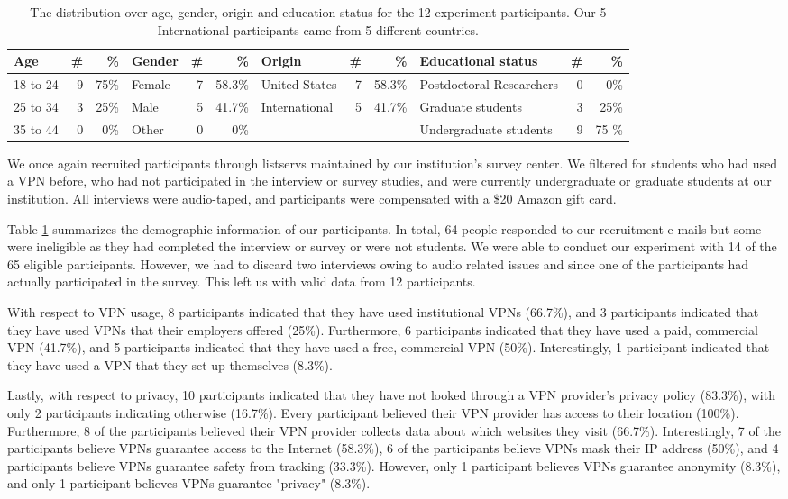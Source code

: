 \begin{table}[h!]
\centering
\begin{tabular}{l r r |l r r|l r r|l r r} 
 \hline
 Age & \# & \% & Gender & \# & \% & Origin & \# & \% & Educational status & \# & \% \\
\hline
18 to 24 & 9 & 75\% & Female & 7 & 58.3\% & United States & 7 & 58.3\% & Postdoctoral Researchers & 0 & 0\% \\
25 to 34 & 3 & 25\% & Male & 5 & 41.7\% & International & 5 & 41.7\% & Graduate students & 3 & 25\% \\
35 to 44 & 0 & 0\% & Other & 0 & 0\% & & & & Undergraduate students & 9 & 75 \% \\
 \hline
\end{tabular}
\caption{The distribution over age, gender, origin and education status for the 12 experiment participants. Our 5 International participants came from 5 different countries.}
\label{tab:experiment_demo}
\end{table}

We once again recruited participants through listservs maintained by our
institution's survey center.  We filtered for students who had used a VPN
before, who had not participated in the interview or survey studies, and were
currently undergraduate or graduate students at our institution.  All
interviews were audio-taped, and participants were compensated with a \$20
Amazon gift card.

Table \ref{tab:experiment_demo} summarizes the demographic information of our participants. In total, 64 people responded to our recruitment e-mails but some were
ineligible as they had completed the interview or survey or were not students.
We were able to conduct our experiment with 14 of the 65 eligible
participants.  However, we had to discard two interviews owing to audio
related issues and since one of the participants had actually participated in
the survey.  This left us with valid data from 12 participants.

With respect to VPN usage, 8 participants indicated that they have used institutional VPNs (66.7\%), and 3 participants indicated that they have used VPNs that their employers offered (25\%).
Furthermore, 6 participants indicated that they have used a paid, commercial VPN (41.7\%), and 5 participants indicated that they have used a free, commercial VPN (50\%).
Interestingly, 1 participant indicated that they have used a VPN that they set up themselves (8.3\%).

Lastly, with respect to privacy, 10 participants indicated that they have not looked through a VPN provider's privacy policy (83.3\%), with only 2 participants indicating otherwise (16.7\%).
Every participant believed their VPN provider has access to their location (100\%).
Furthermore, 8 of the participants believed their VPN provider collects data about which websites they visit (66.7\%).
Interestingly, 7 of the participants believe VPNs guarantee access to the Internet (58.3\%), 6 of the participants believe VPNs mask their IP address (50\%), and 4 participants believe VPNs guarantee safety from tracking (33.3\%).
However, only 1 participant believes VPNs guarantee anonymity (8.3\%), and only 1 participant believes VPNs guarantee "privacy" (8.3\%).

